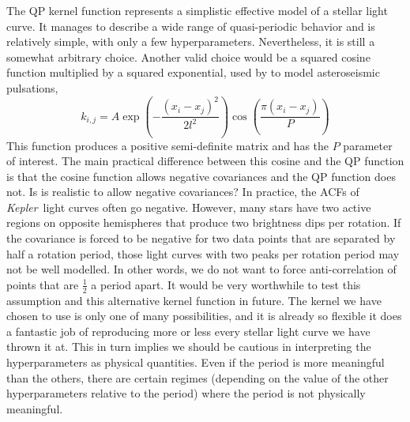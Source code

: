 \documentclass[useAMS, usenatbib, preprint, 12pt]{aastex}
\newcommand{\Kepler}{{\it Kepler}}
\begin{document}
The QP kernel function represents a simplistic effective model of a stellar
light curve.
It manages to describe a wide range of quasi-periodic behavior and is
relatively simple, with only a few hyperparameters.
Nevertheless, it is still a somewhat arbitrary choice.
Another valid choice would be a squared cosine function multiplied by a
squared exponential, used by \citet{Brewer2009} to model asteroseismic
pulsations,
\begin{equation}
k_{i,j} = A \exp \left(-\frac{(x_i - x_j)^2}{2l^2}\right)
\cos\left(\frac{\pi(x_i - x_j)}{P}\right)
\end{equation}
\label{eq:cos_kernel}
This function produces a positive semi-definite matrix and has the $P$
parameter of interest.
The main practical difference between this cosine and the QP function is that
the cosine function allows negative covariances and the QP function does not.
Is is realistic to allow negative covariances?
In practice, the ACFs of \Kepler\ light curves often go negative.
However, many stars have two active regions on opposite hemispheres that
produce two brightness dips per rotation.
If the covariance is forced to be negative for two data points that are
separated by half a rotation period, those light curves with two peaks per
rotation period may not be well modelled.
In other words, we do not want to force anti-correlation of points that are
$\frac{1}{2}$ a period apart.
It would be very worthwhile to test this assumption and this alternative
kernel function in future.
The kernel we have chosen to use is only one of many possibilities, and it is
already so flexible it does a fantastic job of reproducing more or less every
stellar light curve we have thrown it at.
This in turn implies we should be cautious in interpreting the
hyperparameters as physical quantities.
Even if the period is more meaningful than the others, there are certain
regimes (depending on the value of the other hyperparameters relative to the
period) where the period is not physically meaningful.
\end{document}
